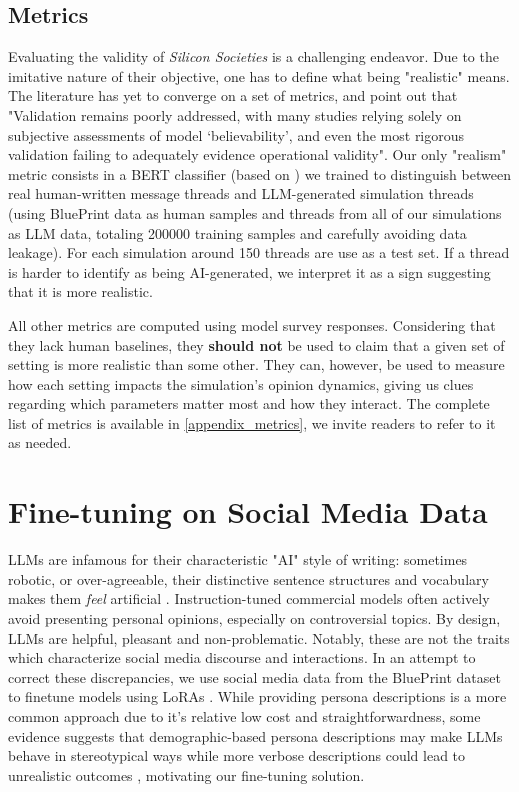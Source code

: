 \documentclass{article} %
\begin{document}
\subsection{Metrics} \label{metrics}

Evaluating the validity of \textit{Silicon Societies} is a challenging endeavor. Due to the imitative nature of their objective, one has to define what being "realistic" means. The literature has yet to converge on a set of metrics, and \citet{larooij2025largelanguagemodelssolve} point out that "Validation remains poorly addressed, with many studies relying solely on subjective assessments of model ‘believability’, and even the most rigorous validation failing to adequately evidence operational validity". Our only "realism" metric consists in a BERT classifier (based on \cite{zhang2022twhin}) we trained to distinguish between real human-written message threads and LLM-generated simulation threads (using BluePrint data as human samples and threads from all of our simulations as LLM data, totaling 200000 training samples and carefully avoiding data leakage). For each simulation around 150 threads are use as a test set. If a thread is harder to identify as being AI-generated, we interpret it as a sign suggesting that it is more realistic.

All other metrics are computed using model survey responses. Considering that they lack human baselines, they \textbf{should not} be used to claim that a given set of setting is more realistic than some other. They can, however, be used to measure how each setting impacts the simulation's opinion dynamics, giving us clues regarding which parameters matter most and how they interact. The complete list of metrics is available in \ref{appendix_metrics}, we invite readers to refer to it as needed.

\section{Fine-tuning on Social Media Data}
\label{finetuning_on_social_media}

LLMs are infamous for their characteristic "AI" style of writing: sometimes robotic, or over-agreeable, their distinctive sentence structures and vocabulary makes them \textit{feel} artificial \citep{Reinhart_2025}. Instruction-tuned commercial models often actively avoid presenting personal opinions, especially on controversial topics. By design, LLMs are helpful, pleasant and non-problematic. Notably, these are not the traits which characterize social media discourse and interactions. In an attempt to correct these discrepancies, we use social media data from the BluePrint dataset \citep{bückkaeffer2025textttblueprintsocialmediauser} to finetune models using LoRAs \citep{hu2021loralowrankadaptationlarge}. While providing persona descriptions is a more common approach due to it's relative low cost and straightforwardness, some evidence suggests that demographic-based persona descriptions may make LLMs behave in stereotypical ways \citep{venkit2026needsociallygroundedpersonaframework} while more verbose descriptions could lead to unrealistic outcomes \citep{li2025llmgeneratedpersonapromise}, motivating our fine-tuning solution.
\end{document}
